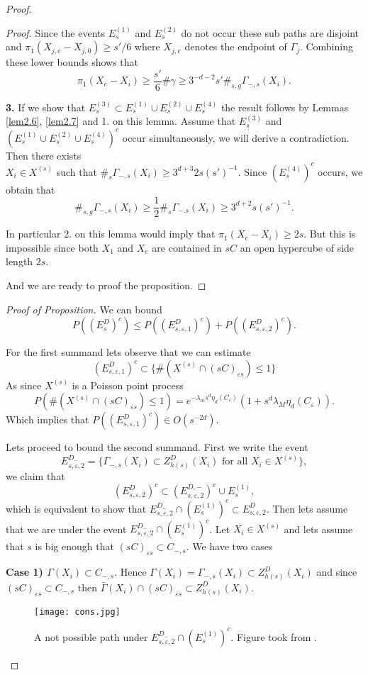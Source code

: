 \begin{proof}
\begin{proof}
Since the events $E_s^{(1)}$ and $E_s^{(2)}$ do not occur these sub paths are disjoint and $\pi_{1}(X_{j,e}-X_{j,0})\geq s'/6$ where $X_{j,e}$ denotes the endpoint of $\Gamma_j$. Combining these lower bounds shows that $$\pi_{1}(X_{e}-X_{i})\geq \frac{s'}{6}\#\gamma\geq 3^{-d-2}s'\#_{s,g}\Gamma_{-,s}(X_i).$$

\textbf{3.} If we show that $E_s^{(3)}\subset E_s^{(1)}\cup E_s^{(2)}\cup E_s^{(4)}$ the result follows by Lemmas \ref{lem2.6}, \ref{lem2.7} and 1. on this lemma. Assume that $E_s^{(3)}$ and $(E_s^{(1)}\cup E_s^{(2)}\cup E_s^{(4)})^c$ occur simultaneously, we will derive a contradiction. Then there exists\\ $X_i\in X^{(s)}$ such that $\#_{s}\Gamma_{-,s}(X_i)\geq 3^{d+3}2s(s')^{-1}$. Since $(E_s^{(4)})^c$ occurs, we obtain that
$$\#_{s,g}\Gamma_{-,s}(X_i)\geq\frac{1}{2}\#_{s}\Gamma_{-.s}(X_i)\geq 3^{d+2}s(s')^{-1}. $$

In particular 2. on this lemma would imply that $\pi_1(X_e-X_i)\geq 2s$. But this is impossible since both $X_1$ and $X_e$ are contained in $sC$ an open hypercube of side length $2s$.

And we are ready to proof the proposition.
\end{proof}
\textit{Proof of Proposition.} We can bound $$P((E^D_s)^c)\leq P((E^D_{s, \varepsilon, 1})^c)+P((E^D_{s, \varepsilon, 2})^c).$$

For the first summand lets observe that we can estimate
$$ (E^D_{s, \varepsilon, 1})^c \subset  \lbrace \#( X^{(s)}\cap (sC)_{\varepsilon s})\leq 1\rbrace$$
As since $X^{(s)}$ is a Poisson point process 
$$P(\#( X^{(s)}\cap (sC)_{\varepsilon s})\leq 1)=e^{-\lambda_m s^d\eta_d( C_{\varepsilon})}(1+s^d\lambda_M\eta_d( C_{\varepsilon})). $$ Which implies that $P((E^D_{s, \varepsilon, 1})^c)\in O(s^{-2d})$.

Lets proceed to bound the second summand. First we write the event 
$$E^{D_-}_{s, \varepsilon, 2}=\lbrace \Gamma_{-, s}(X_i)\subset Z^D_{h(s)}(X_i)\mbox{ for all } X_i\in X^{(s)} \rbrace, $$ we claim that $$(E^{D}_{s, \varepsilon, 2})^c\subset (E^{D,-}_{s, \varepsilon, 2})^c\cup E_s^{(1)},$$ which is equivalent to show that $E^{D_-}_{s, \varepsilon, 2}\cap (E_s^{(1)})^c\subset E^D_{s, \varepsilon, 2}$. Then lets assume that we are under the event $E^{D_-}_{s, \varepsilon, 2}\cap (E_s^{(1)})^c$.
Let $X_i\in X^{(s)}$ and lets assume that $s$ is big enough that $(sC)_{\varepsilon s}\subset C_{-,s}$. We have two cases

\textbf{Case 1) $\Gamma(X_i)\subset C_{-,s}$}. Hence $\Gamma(X_i)=\Gamma_{-, s}(X_i)\subset Z_{h(s)}^D(X_i)$ and since $(sC)_{\varepsilon s}\subset C_{-,s}$ then $\bar{\Gamma}(X_i)\cap (sC)_{\varepsilon s}\subset Z_{h(s)}^D(X_i)$.
\begin{figure}
\captionsetup{width=1\textwidth}
\centering
\texttt{[image: cons.jpg]}
\caption{A not possible path under $E^{D_-}_{s, \varepsilon, 2}\cap (E_s^{(1)})^c$. Figure took from \cite{WIAS}.}
\label{fig.2.5}
\end{figure}


\end{proof}
